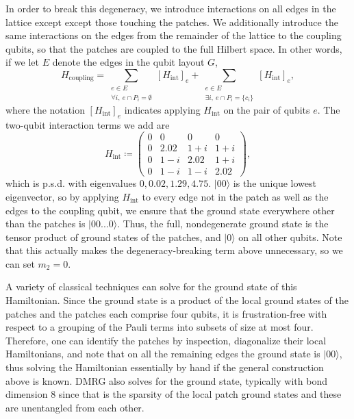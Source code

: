 \documentclass[
  reprint,            %
  amsmath,amssymb,
  aps,
  superscriptaddress, %
  longbibliography
]{revtex4-2}
\theoremstyle{definition}
\begin{document}
In order to break this degeneracy, we introduce interactions on all edges in the lattice except except those touching the patches.
We additionally introduce the same interactions on the edges from the remainder of the lattice to the coupling qubits, so that the patches are coupled to the full Hilbert space.
In other words, if we let $E$ denote the edges in the qubit layout $G$,
\begin{equation}
    H_\mathrm{coupling} = \sum_{\substack{e\in E\\\forall i,~e\cap P_i=\emptyset}}[H_\mathrm{int}]_e + \sum_{\substack{e\in E\\\exists i,~e\cap P_i=\{c_i\}}}[H_\mathrm{int}]_e,
\end{equation}
where the notation $[H_\mathrm{int}]_e$ indicates applying $H_\mathrm{int}$ on the pair of qubits $e$.
The two-qubit interaction terms we add are
\begin{equation}
    H_\mathrm{int}
    \coloneqq
    \begin{pmatrix}
        0 & 0 & 0 & 0 \\
        0 & 2.02 & 1+i & 1+i \\
        0 & 1-i & 2.02 & 1+i \\
        0 & 1-i & 1-i & 2.02
    \end{pmatrix},
\end{equation}
which is p.s.d. with eigenvalues $0, 0.02, 1.29, 4.75$.
$|00\rangle$ is the unique lowest eigenvector, so by applying $H_\text{int}$ to every edge not in the patch as well as the edges to the coupling qubit, we ensure that the ground state everywhere other than the patches is $|00...0\rangle$.
Thus, the full, nondegenerate ground state is the tensor product of ground states of the patches, and $|0\rangle$ on all other qubits.
Note that this actually makes the degeneracy-breaking term above unnecessary, so we can set $m_2=0$.

A variety of classical techniques can solve for the ground state of this Hamiltonian.
Since the ground state is a product of the local ground states of the patches and the patches each comprise four qubits, it is frustration-free with respect to a grouping of the Pauli terms into subsets of size at most four.
Therefore, one can identify the patches by inspection, diagonalize their local Hamiltonians, and note that on all the remaining edges the ground state is $|00\rangle$, thus solving the Hamiltonian essentially by hand if the general construction above is known.
DMRG also solves for the ground state, typically with bond dimension 8 since that is the sparsity of the local patch ground states and these are unentangled from each other.
\end{document}

